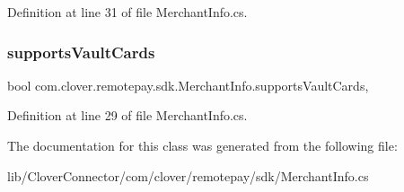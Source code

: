 Definition at line 31 of file Merchant\+Info.\+cs.

\mbox{\label{classcom_1_1clover_1_1remotepay_1_1sdk_1_1_merchant_info_a1252d83fa9541159d3c81aedd237a9ca}} 
\subsubsection{\texorpdfstring{supports\+Vault\+Cards}{supportsVaultCards}}
{\footnotesize\ttfamily bool com.\+clover.\+remotepay.\+sdk.\+Merchant\+Info.\+supports\+Vault\+Cards\hspace{0.3cm}{\ttfamily [get]}, {\ttfamily [set]}}



Definition at line 29 of file Merchant\+Info.\+cs.



The documentation for this class was generated from the following file\+:\begin{DoxyCompactItemize}
\item 
lib/\+Clover\+Connector/com/clover/remotepay/sdk/Merchant\+Info.\+cs\end{DoxyCompactItemize}
